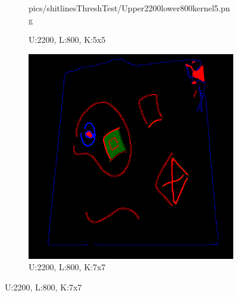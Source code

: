 \documentclass[11pt]{article}
\begin{document}
\begin{figure}[!h]
\begin{subfigure}[t]{.25\textwidth}
		{pics/shitlinesThreshTest/Upper2200lower800kernel5.png}
		\caption{U:2200, L:800, K:5x5}
		\label{kernelExample1}
	\end{subfigure}
\hfill
	\begin{subfigure}[t]{.25\textwidth}
		\centering
		\includegraphics[scale=0.3]
		{pics/shitlinesThreshTest/Upper2200lower800kernel7.png}
		\caption{U:2200, L:800, K:7x7}
		\label{kernelExample2}
	\end{subfigure}



\end{figure}
\end{document}
